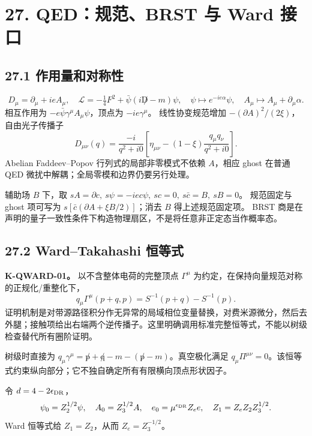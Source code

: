 \documentclass[
  11pt,
  oneside]{book}
\begin{document}
\hypertarget{ch-27}{%
\chapter{27. QED：规范、BRST 与 Ward 接口}\label{ch-27}}

\hypertarget{ux4f5cux7528ux91cfux548cux5bf9ux79f0ux6027}{%
\section{27.1
作用量和对称性}\label{ux4f5cux7528ux91cfux548cux5bf9ux79f0ux6027}}

\[
D_\mu=\partial_\mu+ieA_\mu,\quad
\mathcal L=-\tfrac14F^2+\bar\psi(i\not D-m)\psi,
\quad \psi\mapsto e^{-ie\alpha}\psi,\quad A_\mu\mapsto A_\mu+\partial_\mu\alpha.
\] 相互作用为 \(-e\bar\psi\gamma^\mu A_\mu\psi\)，顶点为
\(-ie\gamma^\mu\)。 线性协变规范增加
\(-(\partial A)^2/(2\xi)\)，自由光子传播子 \[
D_{\mu\nu}(q)=\frac{-i}{q^2+i0}
\left[\eta_{\mu\nu}-(1-\xi)\frac{q_\mu q_\nu}{q^2+i0}\right].
\] Abelian Faddeev--Popov 行列式的局部非零模式不依赖 \(A\)，相应 ghost
在普通 QED 微扰中解耦；全局零模和边界仍要另行处理。

辅助场 \(B\) 下，取
\(sA=\partial c,\ s\psi=-iec\psi,\ sc=0,\ s\bar c=B,\ sB=0\)。
规范固定与 ghost 项可写为 \(s[\bar c(\partial A+\xi B/2)]\)；消去 \(B\)
得上述规范固定项。 BRST
商是在声明的量子一致性条件下构造物理扇区，不是将任意非正定态当作概率态。

\hypertarget{wardtakahashi-ux6052ux7b49ux5f0f}{%
\section{27.2 Ward--Takahashi
恒等式}\label{wardtakahashi-ux6052ux7b49ux5f0f}}

\textbf{K-QWARD-01。} 以不含整体电荷的完整顶点 \(\Gamma^\mu\)
为约定，在保持向量规范对称的正规化/重整化下， \[
q_\mu\Gamma^\mu(p+q,p)=S^{-1}(p+q)-S^{-1}(p).
\]
证明机制是对带源路径积分作无异常的局域相位变量替换，对费米源微分，然后去外腿；接触项给出右端两个逆传播子。这里明确调用标准完整恒等式，不能以树级检查替代所有圈阶证明。

树级时直接为
\(q_\mu\gamma^\mu=\not p+\not q-m-(\not p-m)\)。真空极化满足
\(q_\mu\Pi^{\mu\nu}=0\)。该恒等式约束纵向部分；它不独自确定所有有限横向顶点形状因子。

令 \(d=4-2\epsilon_{\rm DR}\)， \[
\psi_0=Z_2^{1/2}\psi,\quad A_0=Z_3^{1/2}A,\quad
e_0=\mu^{\epsilon_{\rm DR}}Z_e e,\quad
Z_1=Z_eZ_2Z_3^{1/2}.
\] Ward 恒等式给 \(Z_1=Z_2\)，从而 \(Z_e=Z_3^{-1/2}\)。
\end{document}
